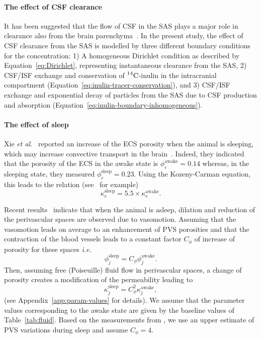 \documentclass[a4paper,11pt]{article}
\newcommand{\ie}{\emph{i.e.}\;}
\newcommand{\etal}{\emph{et al.}\;}
\newcommand{\1}{^{(1)}}
\newcommand{\2}{^{(2)}}
\newcommand{\Cinulin}{$\prescript{14}{}{\text{C}}$-inulin }
\begin{document}
\paragraph{The effect of CSF clearance}
It has been suggested that the flow of CSF in the SAS plays a major role in clearance also from the brain parenchyma~\cite{proulx2021cerebrospinal, hornkjol2022csf}. In the present study, the effect of CSF clearance from the SAS is modelled by three different boundary conditions for the concentration: 1) A homogeneous Dirichlet condition as described by Equation~\eqref{eq:Dirichlet}, representing instantaneous clearance from the SAS, 2) CSF/ISF exchange and conservation of \Cinulin in the intracranial compartment (Equation~\eqref{eq:inulin-tracer-conservation}), and 3) CSF/ISF exchange and exponential decay of particles from the SAS due to CSF production and absorption (Equation~\eqref{eq:inulin-boundary-inhomogeneous}).

\paragraph{The effect of sleep}
Xie \etal~\cite{Xie_2013_sleep} reported an increase of the ECS porosity when the animal is sleeping, which may increase convective transport in the brain~\cite{thomas2022theoretical}. Indeed, they indicated that the porosity of the ECS in the awake state is $\phi_e^\text{awake} = 0.14$ whereas, in the sleeping state, they measured $\phi_e^\text{sleep}=0.23$. Using the Kozeny-Carman equation, this leads to the relation (see~\cite{tithof-2022-glymphatic} for example)
\[
    \kappa_e^{\text{sleep}}= 5.5\times \kappa_e^\text{awake}.
\]

Recent results~\cite{Bojarskaite2022} indicate that when the animal is asleep, dilation and reduction of the perivascular spaces are observed due to vasomotion. Assuming that the vasomotion leads on average to an enhancement of PVS porosities and that the contraction of the blood vessels leads to a constant factor $C_\phi$ of increase of porosity for these spaces \ie 
\[
    \phi^\text{sleep}_j = C_\phi \phi_j^\text{awake}.
\]
Then, assuming free (Poiseuille) fluid flow in perivascular spaces, a change of porosity creates a modification of the permeability leading to 
\[
    \kappa_j^\text{sleep} = C_\phi^2 \kappa_j^\text{awake},
\]
(see Appendix~\ref{app:param-values} for details).
We assume that the parameter values corresponding to the awake state are given by the baseline values of Table~\ref{tab:fluid}. Based on the measurements from \cite{Bojarskaite2022}, we use an upper estimate of PVS variations during sleep and assume $C_\phi=4$.
\end{document}
